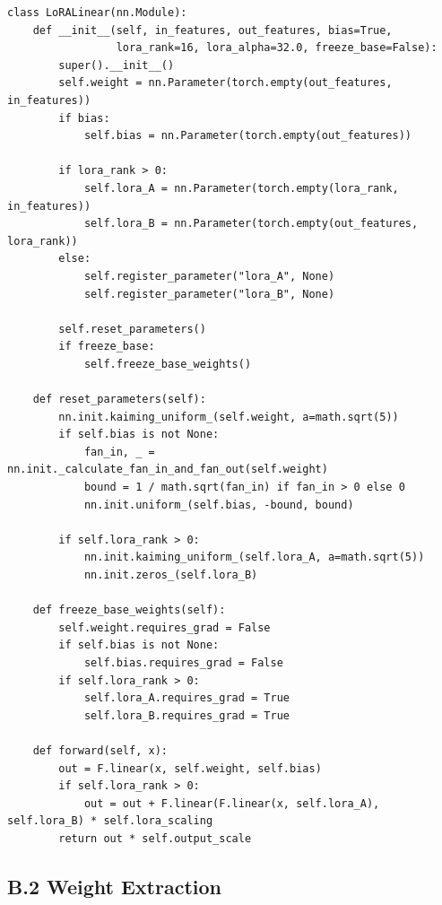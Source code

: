 \begin{lstlisting}
class LoRALinear(nn.Module):
    def __init__(self, in_features, out_features, bias=True,
                 lora_rank=16, lora_alpha=32.0, freeze_base=False):
        super().__init__()
        self.weight = nn.Parameter(torch.empty(out_features, in_features))
        if bias:
            self.bias = nn.Parameter(torch.empty(out_features))
        
        if lora_rank > 0:
            self.lora_A = nn.Parameter(torch.empty(lora_rank, in_features))
            self.lora_B = nn.Parameter(torch.empty(out_features, lora_rank))
        else:
            self.register_parameter("lora_A", None)
            self.register_parameter("lora_B", None)
        
        self.reset_parameters()
        if freeze_base:
            self.freeze_base_weights()
    
    def reset_parameters(self):
        nn.init.kaiming_uniform_(self.weight, a=math.sqrt(5))
        if self.bias is not None:
            fan_in, _ = nn.init._calculate_fan_in_and_fan_out(self.weight)
            bound = 1 / math.sqrt(fan_in) if fan_in > 0 else 0
            nn.init.uniform_(self.bias, -bound, bound)
        
        if self.lora_rank > 0:
            nn.init.kaiming_uniform_(self.lora_A, a=math.sqrt(5))
            nn.init.zeros_(self.lora_B)
    
    def freeze_base_weights(self):
        self.weight.requires_grad = False
        if self.bias is not None:
            self.bias.requires_grad = False
        if self.lora_rank > 0:
            self.lora_A.requires_grad = True
            self.lora_B.requires_grad = True
    
    def forward(self, x):
        out = F.linear(x, self.weight, self.bias)
        if self.lora_rank > 0:
            out = out + F.linear(F.linear(x, self.lora_A), self.lora_B) * self.lora_scaling
        return out * self.output_scale
\end{lstlisting}

\subsection{B.2 Weight Extraction}

